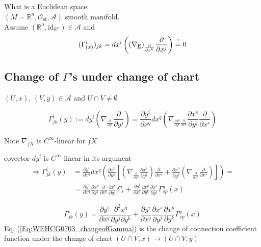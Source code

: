 \documentclass[10pt, twoside]{amsart}
\begin{document}
\begin{multicols*}{2}
What is a Euclidean space: \\
$(M = \mathbb{R}^n, \mathcal{O}_{\text{st}}, \mathcal{A})$ smooth manifold. \\
Assume $(\mathbb{R}^n, \text{id}_{\mathbb{R}^n} ) \in \mathcal{A}$ and 
\[
(\Gamma^i_{(x)})_{jk} = dx^i \left( (\nabla_{\text{\underline{E}}})_{ \frac{ \partial }{ \partial x^k} } \frac{ \partial }{ \partial x^j} \right) \overset{!}{=} 0 
\]


\subsection{Change of $\Gamma$'s under change of chart}

$(U,x)$, $(V,y) \in \mathcal{A}$ and $U \cap V \neq \emptyset$

\[
\Gamma^i_{jk}(y) := dy^i \left( \nabla_{ \frac{ \partial}{ \partial y^k} } \frac{ \partial }{ \partial y^j} \right) = \frac{ \partial y^i}{ \partial x^q }dx^q \left( \nabla_{\frac{ \partial x^p}{ \partial y^k}  \frac{ \partial }{ \partial x^p} } \frac{ \partial x^s}{ \partial y^j} \frac{ \partial }{ \partial x^s } \right)
\]

Note $\nabla_{fX}$ is $C^{\infty}$-linear for $fX$

covector $dy^i$ is $C^{\infty}$-linear in its argument
\[
\begin{aligned}
\Longrightarrow \Gamma_{jk}^i(y) & = \frac{ \partial y^i}{ \partial x^q} dx^q \left( \frac{ \partial x^p}{ \partial y^k} \left[ \left( \nabla_{ \frac{ \partial }{ \partial x^p} } \frac{ \partial x^s}{ \partial y^j} \right) \frac{ \partial }{ \partial x^s} + \frac{ \partial x^s}{ \partial y^j} \left( \nabla_{ \frac{ \partial }{ \partial x^p } } \frac{ \partial }{ \partial x^s } \right)  \right] \right) = \\
& = \frac{ \partial y^i}{ \partial x^q} \frac{ \partial x^p }{ \partial y^k} \frac{ \partial }{ \partial x^p } \frac{ \partial x^s}{ \partial y^j } \delta^q_{ \, \, s} + \frac{ \partial y^i}{ \partial x^q} \frac{ \partial x^p }{ \partial y^k} \frac{ \partial x^s}{ \partial y^j} \Gamma^q_{sp}(x)
\end{aligned}
\]


\begin{equation}\label{Eq:WEHCG0703_changeofGamma}
\Gamma^i_{jk}(y) = \frac{ \partial y^i}{ \partial x^q} \frac{ \partial^2 x^q}{ \partial y^j \partial y^k} + \frac{ \partial y^i}{ \partial x^q } \frac{ \partial x^s }{ \partial y^j} \frac{ \partial x^p }{ \partial y^k} \Gamma^q_{sp}(x)
\end{equation}
Eq. (\ref{Eq:WEHCG0703_changeofGamma}) is the change of connection coefficient function under the change of chart $(U\cap V,x) \to (U\cap V,y)$



\end{multicols*}
\end{document}
